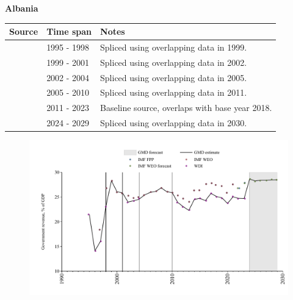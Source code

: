 \documentclass[12pt,a4paper,landscape]{article}
\begin{document}
\begin{adjustbox}{max totalsize={\paperwidth}{\paperheight},center}
\begin{minipage}[t][\textheight][t]{\textwidth}
\vspace*{0.5cm}
{}
\begin{center}
{\Large\bfseries Albania}
\end{center}
\vspace{0.5cm}
\begin{table}[H]
\centering
\small
\begin{tabular}{|l|l|l|}
\hline
\textbf{Source} & \textbf{Time span} & \textbf{Notes} \\
\hline
\rowcolor{white}\cite{WDI}& 1995 - 1998 &Spliced using overlapping data in 1999.\\
\rowcolor{lightgray}\cite{IMF_WEO}& 1999 - 2001 &Spliced using overlapping data in 2002.\\
\rowcolor{white}\cite{WDI}& 2002 - 2004 &Spliced using overlapping data in 2005.\\
\rowcolor{lightgray}\cite{IMF_WEO}& 2005 - 2010 &Spliced using overlapping data in 2011.\\
\rowcolor{white}\cite{WDI}& 2011 - 2023 &Baseline source, overlaps with base year 2018.\\
\rowcolor{lightgray}\cite{IMF_WEO_forecast}& 2024 - 2029 &Spliced using overlapping data in 2030.\\
\hline
\end{tabular}
\end{table}
\begin{figure}[H]
\centering
\includegraphics[width=\textwidth,height=0.6\textheight,keepaspectratio]{graphs/ALB_govrev_GDP.pdf}
\end{figure}
\end{minipage}
\end{adjustbox}
\end{document}
